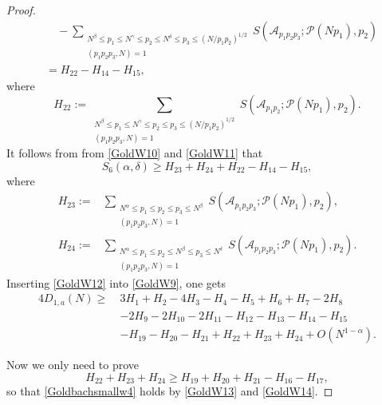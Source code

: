 \documentclass[10pt,a4paper]{amsart}
\def\ge{\geqslant}
\def\le{\leqslant}
\def\leq{\leqslant}
\begin{document}
\begin{proof}
\begin{equation}
\begin{split}
		&\quad - \sum_{\substack{N^\beta \le p_1\le N^\gamma \le p_2\le N^{\delta}\le p_3\le (N/p_1p_2)^{1/2} \\ (p_1 p_2 p_3, N) = 1}}  S(\mathscr{A}_{p_1 p_2 p_3}; \mathscr{P}(Np_1), p_2)\\
		&= H_{22}-H_{14}-H_{15}, 
\end{split}
\end{equation}
where
\begin{equation}
H_{22}:=\sum_{\substack{N^{\beta} \leq p_1 \le N^{\gamma} \leq p_2 \le p_3\le (N/p_1p_2)^{1/2} \\ (p_1 p_2 p_3, N) = 1}} S(\mathscr{A}_{p_1 p_2}; \mathscr{P}(N p_1), p_2). 
\end{equation}
It follows from from \eqref{GoldW10} and \eqref{GoldW11} that 
\begin{equation}\label{GoldW12}
			S_6(\alpha,\delta)\ge H_{23}+H_{24}+H_{22}-H_{14}-H_{15},
		\end{equation}
		where
		\begin{equation}
		\begin{split}
		H_{23}:=&\sum_{\substack{N^\alpha \le p_1 \le p_2 \le p_3\le N^\beta \\ (p_1 p_2 p_3, N) = 1}}  S(\mathscr{A}_{p_1 p_2 p_3}; \mathscr{P}(Np_1), p_2),\\
		H_{24}:=&\sum_{\substack{N^\alpha \le p_1 \le p_2\le N^\beta \le p_3\le N^{\delta} \\ (p_1 p_2 p_3, N) = 1}}  S(\mathscr{A}_{p_1 p_2 p_3}; \mathscr{P}(Np_1), p_2).
		\end{split}
		\end{equation}
Inserting \eqref{GoldW12} into \eqref{GoldW9}, one gets 
		\begin{equation}\label{GoldW13}
		\begin{split}
		4D_{1,a}(N)
		\ge\ 
		& 3H_1+H_2-4H_3-H_4-H_5+H_6+H_7-2H_8\\
		&-2H_9-2H_{10}-2H_{11}-H_{12}-H_{13}-H_{14}-H_{15}\\
		&-H_{19}-H_{20}-H_{21}+H_{22}+H_{23}+H_{24}+O(N^{1-\alpha}).
		\end{split}
		\end{equation}
		
Now we only need to prove  
\begin{equation}\label{GoldW14}
H_{22}+H_{23}+H_{24}\ge H_{19}+H_{20}+H_{21}-H_{16}-H_{17},
\end{equation}
so that \eqref{Goldbachsmallw4} holds by \eqref{GoldW13} and \eqref{GoldW14}.
		

\end{proof}
\end{document}
